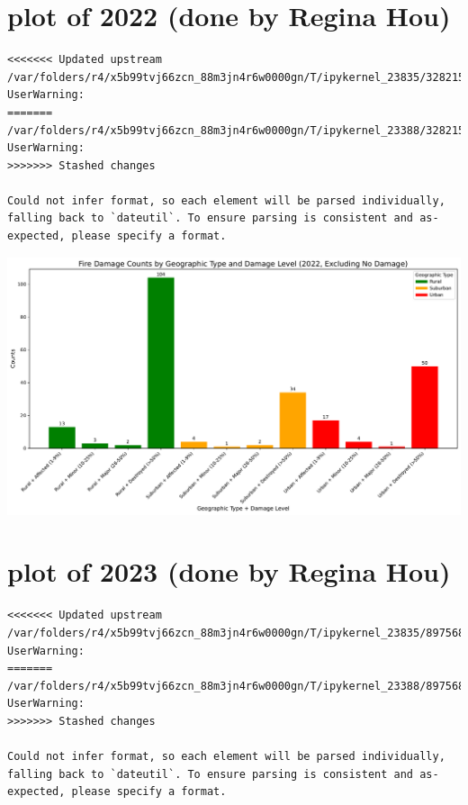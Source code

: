 \documentclass[
  letterpaper,
  DIV=11,
  numbers=noendperiod]{scrartcl}
\begin{document}
\section{plot of 2022 (done by Regina
Hou)}\label{plot-of-2022-done-by-regina-hou}

\begin{verbatim}
<<<<<<< Updated upstream
/var/folders/r4/x5b99tvj66zcn_88m3jn4r6w0000gn/T/ipykernel_23835/3282159924.py:2: UserWarning:
=======
/var/folders/r4/x5b99tvj66zcn_88m3jn4r6w0000gn/T/ipykernel_23388/3282159924.py:2: UserWarning:
>>>>>>> Stashed changes

Could not infer format, so each element will be parsed individually, falling back to `dateutil`. To ensure parsing is consistent and as-expected, please specify a format.
\end{verbatim}

\includegraphics{Final Writeup_files/figure-pdf/cell-16-output-1.pdf}

\section{plot of 2023 (done by Regina
Hou)}\label{plot-of-2023-done-by-regina-hou}

\begin{verbatim}
<<<<<<< Updated upstream
/var/folders/r4/x5b99tvj66zcn_88m3jn4r6w0000gn/T/ipykernel_23835/897568859.py:2: UserWarning:
=======
/var/folders/r4/x5b99tvj66zcn_88m3jn4r6w0000gn/T/ipykernel_23388/897568859.py:2: UserWarning:
>>>>>>> Stashed changes

Could not infer format, so each element will be parsed individually, falling back to `dateutil`. To ensure parsing is consistent and as-expected, please specify a format.
\end{verbatim}
\end{document}
